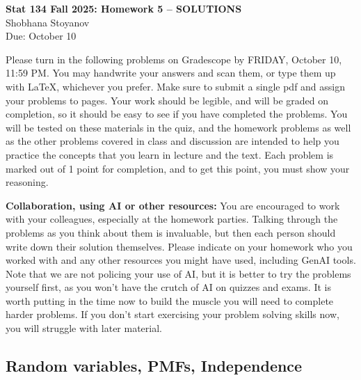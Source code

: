 \documentclass{article}
\begin{document}
\begin{center}
    \textbf{\large Stat 134 Fall 2025: Homework 5 -- SOLUTIONS} \\[6pt]
    Shobhana Stoyanov \\[6pt]
    \small Due: October 10
\end{center}

\vspace{1em}

\noindent Please turn in the following problems on Gradescope by FRIDAY, October 10, 11:59 PM. You may handwrite your answers and scan them, or type them up with \LaTeX, whichever you prefer. Make sure to submit a single pdf and assign your problems to pages. Your work should be legible, and will be graded on completion, so it should be easy to see if you have completed the problems. You will be tested on these materials in the quiz, and the homework problems as well as the other problems covered in class and discussion are intended to help you practice the concepts that you learn in lecture and the text. Each problem is marked out of 1 point for completion, and to get this point, you must show your reasoning.

\bigskip

\noindent \textbf{Collaboration, using AI or other resources:} You are encouraged to work with your colleagues, especially at the homework parties. Talking through the problems as you think about them is invaluable, but then each person should write down their solution themselves. Please indicate on your homework who you worked with and any other resources you might have used, including GenAI tools. Note that we are not policing your use of AI, but it is better to try the problems yourself first, as you won't have the crutch of AI on quizzes and exams. It is worth putting in the time now to build the muscle you will need to complete harder problems. If you don't start exercising your problem solving skills now, you will struggle with later material.

\bigskip

\subsection*{Random variables, PMFs, Independence}
\end{document}
